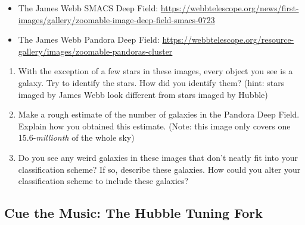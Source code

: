 \documentclass[11pt]{article}
\begin{document}
\begin{enumerate}
\begin{itemize}
        \item The James Webb SMACS Deep Field: \url{https://webbtelescope.org/news/first-images/gallery/zoomable-image-deep-field-smacs-0723}

        \item The James Webb Pandora Deep Field: \url{https://webbtelescope.org/resource-gallery/images/zoomable-pandoras-cluster}
    \end{itemize}
    \begin{enumerate}
        \item With the exception of a few stars in these images, every object you see is a galaxy. Try to identify the stars. How did you identify them? (hint: stars imaged by James Webb look different from stars imaged by Hubble)

        \item Make a rough estimate of the number of galaxies in the Pandora Deep Field. Explain how you obtained this estimate. (Note: this image only covers one 15.6-\emph{millionth} of the whole sky)

        \item Do you see any weird galaxies in these images that don't neatly fit into your classification scheme? If so, describe these galaxies. How could you alter your classification scheme to include these galaxies?
    \end{enumerate}
\end{enumerate}

\subsection{Cue the Music: The Hubble Tuning Fork}
\end{document}
